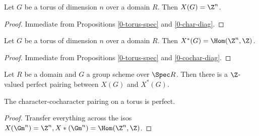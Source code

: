 \begin{proposition}
  \label{0-char-torus}
  \leanok

  Let $G$ be a torus of dimension $n$ over a domain $R$.
  Then $X(G) = \Z^n$.
\end{proposition}
\begin{proof}
  \leanok

  Immediate from Propositions \ref{0-torus-spec} and \ref{0-char-diag}.
\end{proof}


\begin{proposition}
  \label{0-cochar-torus}
  \leanok

  Let $G$ be a torus of dimension $n$ over a domain $R$.
  Then $X^*(G) = \Hom(\Z^n, \Z)$.
\end{proposition}
\begin{proof}

  Immediate from Propositions \ref{0-torus-spec} and \ref{0-cochar-diag}.
\end{proof}


\begin{definition}
  \label{0-char-cochar-pairing}
  \leanok

  Let $R$ be a domain and $G$ a group scheme over $\Spec R$.
  Then there is a $\Z$-valued perfect pairing between $X(G)$ and $X^*(G)$.
\end{definition}


\begin{proposition}
  \label{0-char-cochar-pairing-perfect}
  \leanok

  The character-cocharacter pairing on a torus is perfect.
\end{proposition}
\begin{proof}
  \uses{}
  \leanok

  Transfer everything across the isos $X(\Gm^n) = \Z^n, X*(\Gm^n) = \Hom(\Z^n, \Z)$.
\end{proof}
